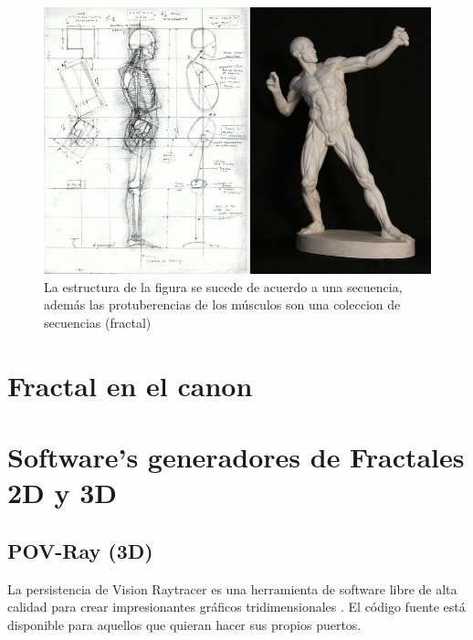\documentclass[
  11pt,
]{krantz}
\theoremstyle{definition}
\theoremstyle{definition}
\theoremstyle{definition}
\theoremstyle{definition}
\theoremstyle{remark}
\begin{document}
\begin{figure}[!ht]

{\centering \includegraphics[width=1\linewidth]{body2} 

}

\caption{La estructura de la figura se sucede de acuerdo a una secuencia, además las protuberencias de los músculos son una coleccion de secuencias (fractal)}\label{fig:body2}
\end{figure}

\hypertarget{fractal-en-el-canon}{%
\section{Fractal en el canon}\label{fractal-en-el-canon}}

\hypertarget{softwares-generadores-de-fractales-2d-y-3d}{%
\section{Software's generadores de Fractales 2D y 3D}\label{softwares-generadores-de-fractales-2d-y-3d}}

\hypertarget{pov-ray-3d}{%
\subsection{POV-Ray (3D)}\label{pov-ray-3d}}

La persistencia de Vision Raytracer es una herramienta de software libre de alta calidad para crear impresionantes gráficos tridimensionales . El código fuente está disponible para aquellos que quieran hacer sus propios puertos.
\end{document}
